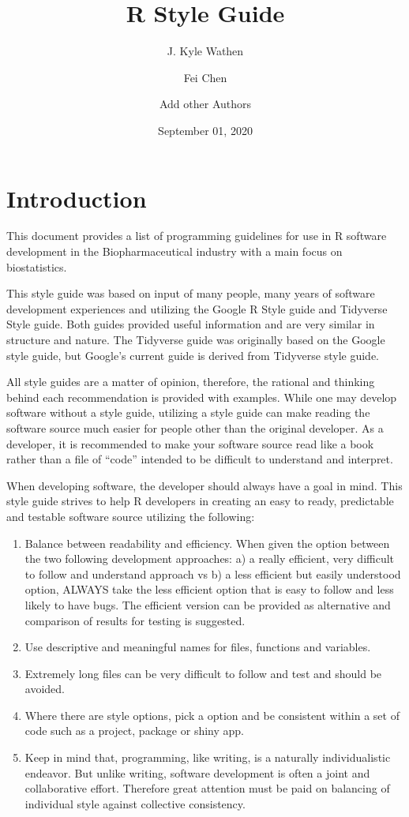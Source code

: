 \documentclass[
]{book}
\title{R Style Guide}
\author{J. Kyle Wathen \and Fei Chen \and Add other Authors}
\date{September 01, 2020}
\begin{document}
\maketitle

{
\setcounter{tocdepth}{1}
\tableofcontents
}
\hypertarget{introduction}{%
\chapter{Introduction}\label{introduction}}

This document provides a list of programming guidelines for use in R software development in the Biopharmaceutical industry with a main focus on biostatistics.

This style guide was based on input of many people, many years of software development experiences and utilizing the Google R Style guide and Tidyverse Style guide. Both guides provided useful information and are very similar in structure and nature. The Tidyverse guide was originally based on the Google style guide, but Google's current guide is derived from Tidyverse style guide.

All style guides are a matter of opinion, therefore, the rational and thinking behind each recommendation is provided with examples. While one may develop software without a style guide, utilizing a style guide can make reading the software source much easier for people other than the original developer. As a developer, it is recommended to make your software source read like a book rather than a file of ``code'' intended to be difficult to understand and interpret.

When developing software, the developer should always have a goal in mind. This style guide strives to help R developers in creating an easy to ready, predictable and testable software source utilizing the following:

\begin{enumerate}
\def\labelenumi{\arabic{enumi}.}
\item
  Balance between readability and efficiency. When given the option between the two following development approaches: a) a really efficient, very difficult to follow and understand approach vs b) a less efficient but easily understood option, ALWAYS take the less efficient option that is easy to follow and less likely to have bugs. The efficient version can be provided as alternative and comparison of results for testing is suggested.
\item
  Use descriptive and meaningful names for files, functions and variables.
\item
  Extremely long files can be very difficult to follow and test and should be avoided.
\item
  Where there are style options, pick a option and be consistent within a set of code such as a project, package or shiny app.
\item
  Keep in mind that, programming, like writing, is a naturally
  individualistic endeavor. But unlike writing, software development is
  often a joint and collaborative effort. Therefore great attention must
  be paid on balancing of individual style against collective
  consistency.
\end{enumerate}
\end{document}
